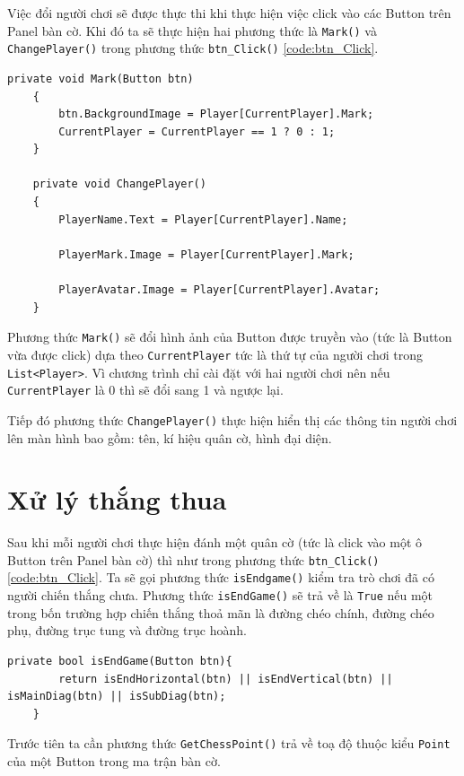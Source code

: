 Việc đổi người chơi sẽ được thực thi khi thực hiện việc click vào các Button trên Panel bàn cờ. Khi đó ta sẽ thực hiện hai phương thức là \texttt{Mark()} và \texttt{ChangePlayer()} trong phương thức \texttt{btn\_Click()} \ref{code:btn_Click}.

\begin{lstlisting}[language={[Sharp]C},label={code:btn_Click}, caption = Phương thức \texttt{btn\_Click()}]
	private void Mark(Button btn)
	{
		btn.BackgroundImage = Player[CurrentPlayer].Mark;
		CurrentPlayer = CurrentPlayer == 1 ? 0 : 1;
	}

	private void ChangePlayer()
	{
		PlayerName.Text = Player[CurrentPlayer].Name;

		PlayerMark.Image = Player[CurrentPlayer].Mark;

		PlayerAvatar.Image = Player[CurrentPlayer].Avatar;
	}
\end{lstlisting}

Phương thức \texttt{Mark()} sẽ đổi hình ảnh của Button được truyền vào (tức là Button vừa được click) dựa theo \texttt{CurrentPlayer} tức là thứ tự của người chơi trong \texttt{List<Player>}. Vì chương trình chỉ cài đặt với hai người chơi nên nếu \texttt{CurrentPlayer} là 0 thì sẽ đổi sang 1 và ngược lại.

Tiếp đó phương thức \texttt{ChangePlayer()} thực hiện hiển thị các thông tin người chơi lên màn hình bao gồm: tên, kí hiệu quân cờ, hình đại diện.

\section{Xử lý thắng thua}

Sau khi mỗi người chơi thực hiện đánh một quân cờ (tức là click vào một ô Button trên Panel bàn cờ) thì như trong phương thức \texttt{btn\_Click()} \ref{code:btn_Click}. Ta sẽ gọi phương thức \texttt{isEndgame()} kiểm tra trò chơi đã có người chiến thắng chưa. Phương thức \texttt{isEndGame()} sẽ trả về là \texttt{True} nếu một trong bốn trường hợp chiến thắng thoả mãn là đường chéo chính, đường chéo phụ, đường trục tung và đường trục hoành.

\begin{lstlisting}[language={[Sharp]C},label={code:btn_Click}, caption = Phương thức \texttt{isEndGame()}]
	private bool isEndGame(Button btn){
		return isEndHorizontal(btn) || isEndVertical(btn) || isMainDiag(btn) || isSubDiag(btn);
	}
\end{lstlisting}

Trước tiên ta cần phương thức \texttt{GetChessPoint()} trả về toạ độ thuộc kiểu \texttt{Point} của một Button trong ma trận bàn cờ. 

